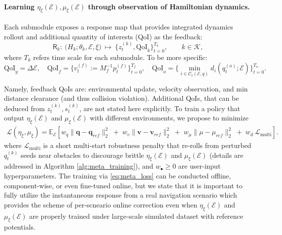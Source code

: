 \documentclass{article} %
\let\vec=\boldsymbol
\begin{document}
\paragraph{Learning $\eta_{\xi}(\mathcal{E}), \mu_\xi(\mathcal{E})$ through observation of Hamiltonian dynamics.}
Each submodule exposes a response map that provides integrated dynamics rollout and additional quantity of interests (QoI) as the feedback:
\[
\mathsf{R}_k:\ \big(H_k;\theta_k,\mathcal E, \xi)\ \longmapsto\ 
\{z_t^{(k)}, \mathrm{QoI}_k\}_{t=0}^{T_k},\qquad k\in\mathcal{K},
\]
where $T_k$ refers time scale for each submodule. To be more specific:
\begin{equation}
    \mathrm{QoI}_{y}=\Delta\mathcal{E}, \quad \mathrm{QoI}_{f}=\{v_t^{(f)}:=M_f^{-1}p_t^{(f)}\}_{t=0}^{T_f} ,\quad \mathrm{QoI}_{o}= \{\min_{i\in\mathcal{C}_t(\mathcal{E},q)} d_i(q_t^{(o)};\mathcal{E})\}_{t=0}^{T_o}.
\end{equation}

Namely, feedback QoIs are: environmental update, velocity observation, and min distance clearance (and thus collision violation). Additional QoIs, that can be deduced from $z_t^{(k)},s_t^{(k)}$, are not stated here explicitly. To train a policy that output $\eta_{\xi}(\mathcal{E})$ and $\mu_{\xi}(\mathcal{E})$ with different environments, we propose to minimize
\begin{equation}
\label{eq:meta_loss}
\begin{aligned}
\mathcal L(\eta_\xi,\mu_\xi)
= \mathbb{E}_{\mathcal{E}}\left[
w_{q}\big\|\vec{q}-\vec{q}_{ref}\big\|_2^2
\;+\;
w_{v}\big\|\vec{v}-\vec{v}_{ref}\big\|_2^2
\;+\;
w_{\mu}\big\|\mu-\mu_{ref}\big\|_2^2
\;+\;
w_{d}\ \mathcal L_{\text{multi}}\right].
\end{aligned}
\end{equation}
where $\mathcal L_{\text{multi}}$ is a short multi-start robustness penalty that re-rolls from perturbed $q_t^{(k)}$ seeds near obstacles to discourage brittle $\eta_{\xi}(\mathcal{E})$ and $\mu_{\xi}(\mathcal{E})$ (details are addressed in Algorithm \ref{alg:meta_training}), and $w_{\bullet}\!\ge\!0$ are user-input hyperparameters. The training via \cref{eq:meta_loss} can be conducted offline, component-wise, or even fine-tuned online, but we state that it is important to fully utilize the instantaneous response from a real navigation scenario which provides the scheme of per-scneario online correction even when $\eta_\xi(\mathcal{E})$ and $\mu_\xi(\mathcal{E})$ are properly trained under large-scale simulated dataset with reference potentials.
\end{document}
